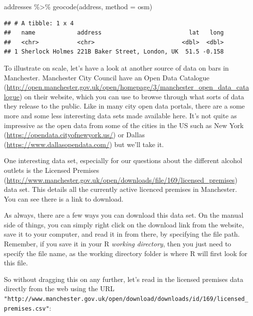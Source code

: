 \documentclass[
]{book}
\newenvironment{Shaded}{\begin{snugshade}}{\end{snugshade}}
\newcommand{\AttributeTok}[1]{\textcolor[rgb]{0.77,0.63,0.00}{#1}}
\newcommand{\FunctionTok}[1]{\textcolor[rgb]{0.00,0.00,0.00}{#1}}
\newcommand{\NormalTok}[1]{#1}
\newcommand{\SpecialCharTok}[1]{\textcolor[rgb]{0.00,0.00,0.00}{#1}}
\newcommand{\StringTok}[1]{\textcolor[rgb]{0.31,0.60,0.02}{#1}}
\begin{document}
\begin{Shaded}
\begin{Highlighting}[]
\NormalTok{addresses }\SpecialCharTok{\%\textgreater{}\%} 
  \FunctionTok{geocode}\NormalTok{(address, }\AttributeTok{method =} \StringTok{\textquotesingle{}osm\textquotesingle{}}\NormalTok{)}
\end{Highlighting}
\end{Shaded}

\begin{verbatim}
## # A tibble: 1 x 4
##   name            address                         lat   long
##   <chr>           <chr>                         <dbl>  <dbl>
## 1 Sherlock Holmes 221B Baker Street, London, UK  51.5 -0.158
\end{verbatim}

To illustrate on scale, let's have a look at another source of data on bars in Manchester. Manchester City Council have an Open Data Catalogue (\url{http://open.manchester.gov.uk/open/homepage/3/manchester_open_data_catalogue}) on their website, which you can use to browse through what sorts of data they release to the public. Like in many city open data portals, there are a some more and some less interesting data sets made available here. It's not quite as impressive as the open data from some of the cities in the US such as New York (\url{https://opendata.cityofnewyork.us/}) or Dallas (\url{https://www.dallasopendata.com/}) but we'll take it.

One interesting data set, especially for our questions about the different alcohol outlets is the Licensed Premises (\url{http://www.manchester.gov.uk/open/downloads/file/169/licensed_premises}) data set. This details all the currently active licenced premises in Manchester. You can see there is a link to download.

As always, there are a few ways you can download this data set. On the manual side of things, you can simply right click on the download link from the website, save it to your computer, and read it in from there, by specifying the file path. Remember, if you save it in your R \emph{working directory}, then you just need to specify the file name, as the working directory folder is where R will first look for this file.

So without dragging this on any further, let's read in the licensed premises data directly from the web using the URL \texttt{"http://www.manchester.gov.uk/open/download/downloads/id/169/licensed\_premises.csv"}:
\end{document}
